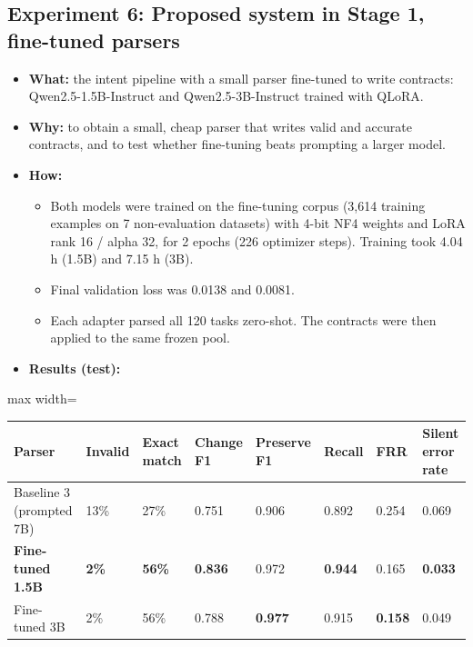 \documentclass[11pt]{article}
\providecommand{\tightlist}{\setlength{\itemsep}{0pt}\setlength{\parskip}{0pt}}
\begin{document}
\subsection{Experiment 6: Proposed system in Stage 1, fine-tuned
parsers}

\begin{itemize}
\tightlist
\item
  \textbf{What:} the intent pipeline with a small parser fine-tuned to
  write contracts: Qwen2.5-1.5B-Instruct and Qwen2.5-3B-Instruct trained
  with QLoRA.
\item
  \textbf{Why:} to obtain a small, cheap parser that writes valid and
  accurate contracts, and to test whether fine-tuning beats prompting a
  larger model.
\item
  \textbf{How:}

  \begin{itemize}
  \tightlist
  \item
    Both models were trained on the fine-tuning corpus (3,614 training
    examples on 7 non-evaluation datasets) with 4-bit NF4 weights and
    LoRA rank 16 / alpha 32, for 2 epochs (226 optimizer steps).
    Training took 4.04 h (1.5B) and 7.15 h (3B).
  \item
    Final validation loss was 0.0138 and 0.0081.
  \item
    Each adapter parsed all 120 tasks zero-shot. The contracts were then
    applied to the same frozen pool.
  \end{itemize}
\item
  \textbf{Results (test):}
\end{itemize}

\begin{table}[!tp]
\centering\scriptsize\setlength{\tabcolsep}{3pt}\renewcommand{\arraystretch}{1.1}
\begin{adjustbox}{max width=\textwidth}\begin{tabular}{llllllll}
\toprule
\textbf{Parser} & \textbf{Invalid} & \textbf{Exact match} & \textbf{Change F1} & \textbf{Preserve F1} & \textbf{Recall} & \textbf{FRR} & \textbf{Silent error rate} \\
\midrule
Baseline 3 (prompted 7B) & 13\% & 27\% & 0.751 & 0.906 & 0.892 & 0.254 & 0.069 \\
\textbf{Fine-tuned 1.5B} & \textbf{2\%} & \textbf{56\%} & \textbf{0.836} & 0.972 & \textbf{0.944} & 0.165 & \textbf{0.033} \\
Fine-tuned 3B & 2\% & 56\% & 0.788 & \textbf{0.977} & 0.915 & \textbf{0.158} & 0.049 \\
\bottomrule
\end{tabular}\end{adjustbox}
\end{table}
\end{document}
